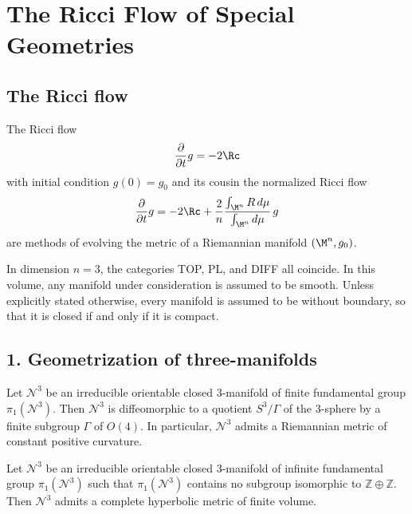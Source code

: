 \chapter{The Ricci Flow of Special Geometries}

\section*{The Ricci flow}

The Ricci flow
\[
\frac{\partial}{\partial t} g = -2 \Rc
\]
with initial condition $g(0)=g_0$ and its cousin the normalized Ricci flow
\[
\frac{\partial}{\partial t} g
= -2 \Rc + \frac{2}{n}\frac{\int_{\M^n} R\, d\mu}{\int_{\M^n} d\mu}\, g
\]
are methods of evolving the metric of a Riemannian manifold $(\M^n,g_0)$.

\begin{remark}
\label{ch01-rem-manifolds-smooth-boundaryless}
In dimension $n=3$, the categories TOP, PL, and DIFF all coincide. In this volume, any manifold under consideration is assumed to be smooth. Unless explicitly stated otherwise, every manifold is assumed to be without boundary, so that it is closed if and only if it is compact.
\end{remark}

\section*{1. Geometrization of three-manifolds}

\begin{conjecture}
\label{ch01-conj-elliptization}
Let $\mathcal{N}^3$ be an irreducible orientable closed $3$-manifold of finite fundamental group $\pi_1(\mathcal{N}^3)$. Then $\mathcal{N}^3$ is diffeomorphic to a quotient $S^3/\Gamma$ of the $3$-sphere by a finite subgroup $\Gamma$ of $O(4)$. In particular, $\mathcal{N}^3$ admits a Riemannian metric of constant positive curvature.
\end{conjecture}

\begin{conjecture}
\label{ch01-conj-hyperbolization}
Let $\mathcal{N}^3$ be an irreducible orientable closed $3$-manifold of infinite fundamental group $\pi_1(\mathcal{N}^3)$ such that $\pi_1(\mathcal{N}^3)$ contains no subgroup isomorphic to $\mathbb{Z}\oplus\mathbb{Z}$. Then $\mathcal{N}^3$ admits a complete hyperbolic metric of finite volume.
\end{conjecture}

